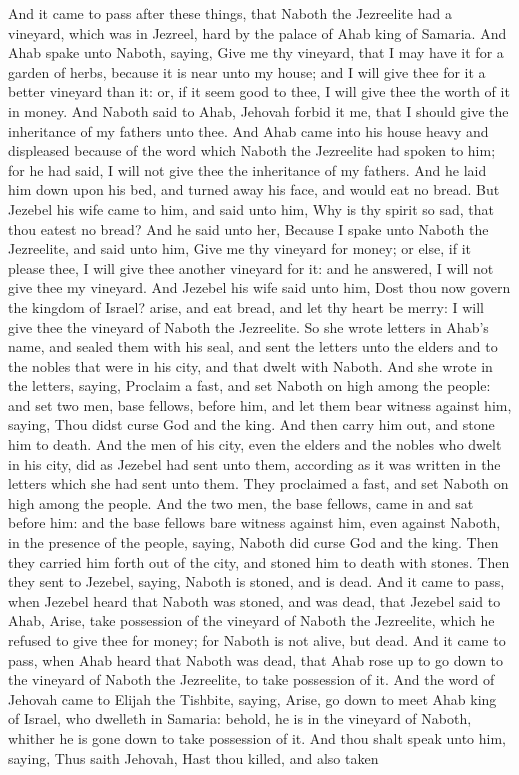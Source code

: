 And it came to pass after these things, that Naboth the Jezreelite had a vineyard, which was in Jezreel, hard by the palace of Ahab king of Samaria. And Ahab spake unto Naboth, saying, Give me thy vineyard, that I may have it for a garden of herbs, because it is near unto my house; and I will give thee for it a better vineyard than it: or, if it seem good to thee, I will give thee the worth of it in money. And Naboth said to Ahab, Jehovah forbid it me, that I should give the inheritance of my fathers unto thee. And Ahab came into his house heavy and displeased because of the word which Naboth the Jezreelite had spoken to him; for he had said, I will not give thee the inheritance of my fathers. And he laid him down upon his bed, and turned away his face, and would eat no bread.  But Jezebel his wife came to him, and said unto him, Why is thy spirit so sad, that thou eatest no bread? And he said unto her, Because I spake unto Naboth the Jezreelite, and said unto him, Give me thy vineyard for money; or else, if it please thee, I will give thee another vineyard for it: and he answered, I will not give thee my vineyard. And Jezebel his wife said unto him, Dost thou now govern the kingdom of Israel? arise, and eat bread, and let thy heart be merry: I will give thee the vineyard of Naboth the Jezreelite. So she wrote letters in Ahab’s name, and sealed them with his seal, and sent the letters unto the elders and to the nobles that were in his city, and that dwelt with Naboth. And she wrote in the letters, saying, Proclaim a fast, and set Naboth on high among the people: and set two men, base fellows, before him, and let them bear witness against him, saying, Thou didst curse God and the king. And then carry him out, and stone him to death.  And the men of his city, even the elders and the nobles who dwelt in his city, did as Jezebel had sent unto them, according as it was written in the letters which she had sent unto them. They proclaimed a fast, and set Naboth on high among the people. And the two men, the base fellows, came in and sat before him: and the base fellows bare witness against him, even against Naboth, in the presence of the people, saying, Naboth did curse God and the king. Then they carried him forth out of the city, and stoned him to death with stones. Then they sent to Jezebel, saying, Naboth is stoned, and is dead. And it came to pass, when Jezebel heard that Naboth was stoned, and was dead, that Jezebel said to Ahab, Arise, take possession of the vineyard of Naboth the Jezreelite, which he refused to give thee for money; for Naboth is not alive, but dead. And it came to pass, when Ahab heard that Naboth was dead, that Ahab rose up to go down to the vineyard of Naboth the Jezreelite, to take possession of it.  And the word of Jehovah came to Elijah the Tishbite, saying, Arise, go down to meet Ahab king of Israel, who dwelleth in Samaria: behold, he is in the vineyard of Naboth, whither he is gone down to take possession of it. And thou shalt speak unto him, saying, Thus saith Jehovah, Hast thou killed, and also taken 